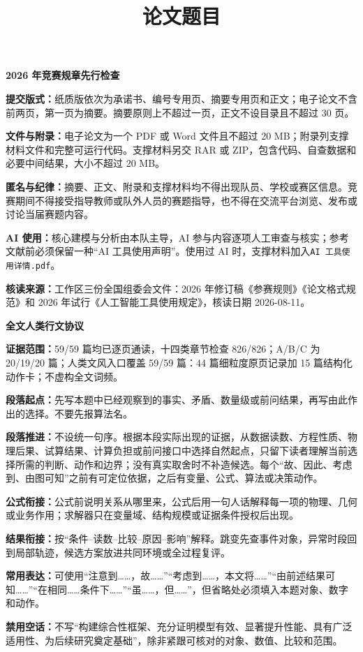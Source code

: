 \documentclass[withoutpreface,bwprint]{cumcmthesis}
\title{论文题目}
\newif\ifmcmguidance
\newcommand{\MCMGuideField}[2]{\par\noindent\textbf{#1：}#2}
\newcommand{\MCMEvidenceScope}{59/59 篇均已逐页通读，十四类章节检查 826/826；A/B/C 为 20/19/20 篇}
\newcommand{\MCMHumanStyleScope}{人类文风入口覆盖 59/59 篇：44 篇细粒度原页记录加 15 篇结构化动作卡；不虚构全文词频}
\begin{document}
\maketitle

\ifmcmguidance
  \begin{mcmguidebox}
    \small
    {\color{mcmguidehead}\bfseries 2026 年竞赛规章先行检查}
    \MCMGuideField{提交版式}{纸质版依次为承诺书、编号专用页、摘要专用页和正文；电子论文不含前两页，第一页为摘要。摘要原则上不超过一页，正文不设目录且不超过 30 页。}
    \MCMGuideField{文件与附录}{电子论文为一个 PDF 或 Word 文件且不超过 20 MB；附录列支撑材料文件和完整可运行代码。支撑材料另交 RAR 或 ZIP，包含代码、自查数据和必要中间结果，大小不超过 20 MB。}
    \MCMGuideField{匿名与纪律}{摘要、正文、附录和支撑材料均不得出现队员、学校或赛区信息。竞赛期间不得接受指导教师或队外人员的赛题指导，也不得在交流平台浏览、发布或讨论当届赛题内容。}
    \MCMGuideField{AI 使用}{核心建模与分析由本队主导，AI 参与内容逐项人工审查与核实；参考文献前必须保留一种“AI 工具使用声明”。使用过 AI 时，支撑材料加入\texttt{AI 工具使用详情.pdf}。}
    \MCMGuideField{核读来源}{工作区三份全国组委会文件：2026 年修订稿《参赛规则》《论文格式规范》和 2026 年试行《人工智能工具使用规定》，核读日期 2026-08-11。}
  \end{mcmguidebox}

  \begin{mcmguidebox}
    \small
    {\color{mcmguidehead}\bfseries 全文人类行文协议}
    \MCMGuideField{证据范围}{\MCMEvidenceScope；\MCMHumanStyleScope。}
    \MCMGuideField{段落起点}{先写本题中已经观察到的事实、矛盾、数量级或前问结果，再写由此作出的选择。不要先报算法名。}
    \MCMGuideField{段落推进}{不设统一句序。根据本段实际出现的证据，从数据读数、方程性质、物理后果、试算结果、计算负担或前问接口中选择自然起点，只留下读者理解当前选择所需的判断、动作和边界；没有真实取舍时不补造候选。每个“故、因此、考虑到、由图可知”之前有可定位依据，之后有变量、公式、算法或决策动作。}
    \MCMGuideField{公式衔接}{公式前说明关系从哪里来，公式后用一句人话解释每一项的物理、几何或业务作用；求解器只在变量域、结构规模或证据条件授权后出现。}
    \MCMGuideField{结果衔接}{按“条件--读数--比较--原因--影响”解释。跳变先查事件对象，异常时段回到局部轨迹，候选方案放进共同环境或全过程复评。}
    \MCMGuideField{常用表达}{可使用“注意到……，故……”“考虑到……，本文将……”“由前述结果可知……”“在相同……条件下……”“虽……，但……”，但省略处必须填入本题对象、数字和动作。}
    \MCMGuideField{禁用空话}{不写“构建综合性框架、充分证明模型有效、显著提升性能、具有广泛适用性、为后续研究奠定基础”，除非紧跟可核对的对象、数值、比较和范围。}
  \end{mcmguidebox}
\end{document}
